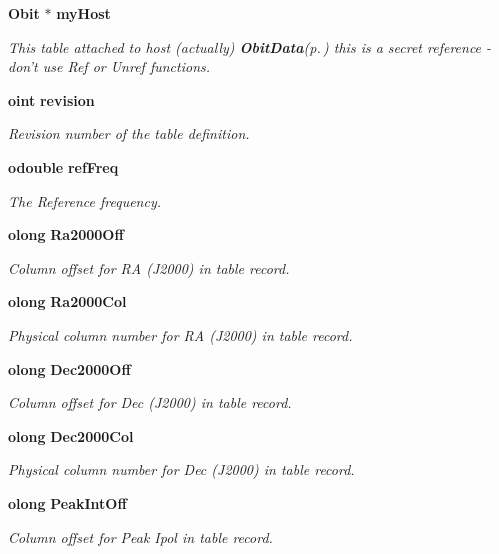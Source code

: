\begin{CompactItemize}
{\bf Obit} $\ast$ {\bf my\-Host}
\begin{CompactList}\small\item\em This table attached to host (actually) {\bf Obit\-Data}{\rm (p.\,\pageref{structObitData})} this is a secret reference - don't use Ref or Unref functions. \item\end{CompactList}\item 
{\bf oint} {\bf revision}
\begin{CompactList}\small\item\em Revision number of the table definition. \item\end{CompactList}\item 
{\bf odouble} {\bf ref\-Freq}
\begin{CompactList}\small\item\em The Reference frequency. \item\end{CompactList}\item 
{\bf olong} {\bf Ra2000Off}
\begin{CompactList}\small\item\em Column offset for RA (J2000) in table record. \item\end{CompactList}\item 
{\bf olong} {\bf Ra2000Col}
\begin{CompactList}\small\item\em Physical column number for RA (J2000) in table record. \item\end{CompactList}\item 
{\bf olong} {\bf Dec2000Off}
\begin{CompactList}\small\item\em Column offset for Dec (J2000) in table record. \item\end{CompactList}\item 
{\bf olong} {\bf Dec2000Col}
\begin{CompactList}\small\item\em Physical column number for Dec (J2000) in table record. \item\end{CompactList}\item 
{\bf olong} {\bf Peak\-Int\-Off}
\begin{CompactList}\small\item\em Column offset for Peak Ipol in table record. \item\end{CompactList}\item 

\end{CompactItemize}
